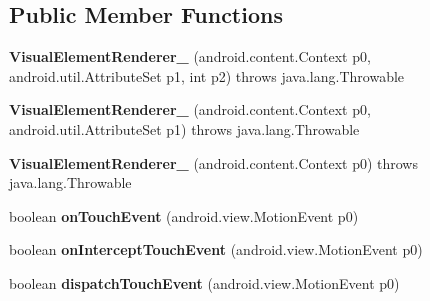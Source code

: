 \subsection*{Public Member Functions}
\begin{DoxyCompactItemize}
\item 
\mbox{\label{classmd5b60ffeb829f638581ab2bb9b1a7f4f3f_1_1VisualElementRenderer__1_a0cda467c85fce2d9022689cb94ec71d6}} 
{\bfseries Visual\+Element\+Renderer\+\_} (android.\+content.\+Context p0, android.\+util.\+Attribute\+Set p1, int p2)  throws java.\+lang.\+Throwable 	
\item 
\mbox{\label{classmd5b60ffeb829f638581ab2bb9b1a7f4f3f_1_1VisualElementRenderer__1_acec8fdec15887080a4ca53e275938cc9}} 
{\bfseries Visual\+Element\+Renderer\+\_} (android.\+content.\+Context p0, android.\+util.\+Attribute\+Set p1)  throws java.\+lang.\+Throwable 	
\item 
\mbox{\label{classmd5b60ffeb829f638581ab2bb9b1a7f4f3f_1_1VisualElementRenderer__1_accf7106e42d6c5739ba4e1dec553a0e6}} 
{\bfseries Visual\+Element\+Renderer\+\_} (android.\+content.\+Context p0)  throws java.\+lang.\+Throwable 	
\item 
\mbox{\label{classmd5b60ffeb829f638581ab2bb9b1a7f4f3f_1_1VisualElementRenderer__1_a3beb6d0ebf9e1eca68fed2eac13c88ac}} 
boolean {\bfseries on\+Touch\+Event} (android.\+view.\+Motion\+Event p0)
\item 
\mbox{\label{classmd5b60ffeb829f638581ab2bb9b1a7f4f3f_1_1VisualElementRenderer__1_af640d27a1867f3d3c63a835f6fd57ecf}} 
boolean {\bfseries on\+Intercept\+Touch\+Event} (android.\+view.\+Motion\+Event p0)
\item 
\mbox{\label{classmd5b60ffeb829f638581ab2bb9b1a7f4f3f_1_1VisualElementRenderer__1_a76b5ca405a881f2e09918f282c760285}} 
boolean {\bfseries dispatch\+Touch\+Event} (android.\+view.\+Motion\+Event p0)

\end{DoxyCompactItemize}
